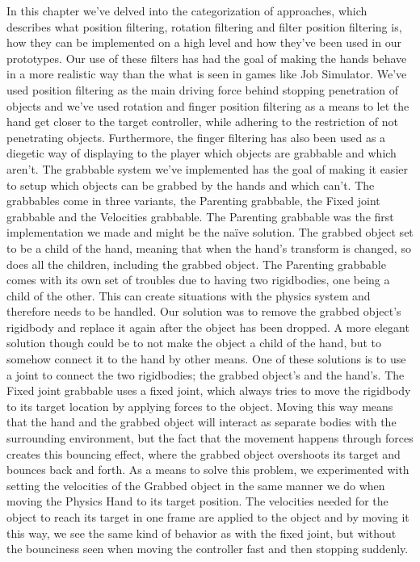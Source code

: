In this chapter we've delved into the categorization of approaches, which describes what position filtering, rotation filtering and filter position filtering is, how they can be implemented on a high level and how they've been used in our prototypes. Our use of these filters has had the goal of making the hands behave in a more realistic way than the what is seen in games like Job Simulator. We've used position filtering as the main driving force behind stopping penetration of objects and we've used rotation and finger position filtering as a means to let the hand get closer to the target controller, while adhering to the restriction of not penetrating objects. Furthermore, the finger filtering has also been used as a diegetic way of displaying to the player which objects are grabbable and which aren't.
The grabbable system we've implemented has the goal of making it easier to setup which objects can be grabbed by the hands and which can't. The grabbables come in three variants, the Parenting grabbable, the Fixed joint grabbable and the Velocities grabbable. The Parenting grabbable was the first implementation we made and might be the naïve solution. The grabbed object set to be a child of the hand, meaning that when the hand's transform is changed, so does all the children, including the grabbed object. The Parenting grabbable comes with its own set of troubles due to having two rigidbodies, one being a child of the other. This can create situations with the physics system and therefore needs to be handled. Our solution was to remove the grabbed object's rigidbody and replace it again after the object has been dropped. A more elegant solution though could be to not make the object a child of the hand, but to somehow connect it to the hand by other means. One of these solutions is to use a joint to connect the two rigidbodies; the grabbed object's and the hand's. The Fixed joint grabbable uses a fixed joint, which always tries to move the rigidbody to its target location by applying forces to the object. Moving this way means that the hand and the grabbed object will interact as separate bodies with the surrounding environment, but the fact that the movement happens through forces creates this bouncing effect, where the grabbed object overshoots its target and bounces back and forth. As a means to solve this problem, we experimented with setting the velocities of the Grabbed object in the same manner we do when moving the Physics Hand to its target position. The velocities needed for the object to reach its target in one frame are applied to the object and by moving it this way, we see the same kind of behavior as with the fixed joint, but without the bounciness seen when moving the controller fast and then stopping suddenly.

